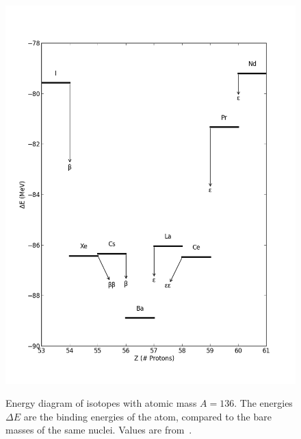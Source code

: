 \begin{figure}
\begin{center}
\includegraphics[keepaspectratio=true,width=\textwidth]{scripts/LevelDiagram.png}
\end{center}
\renewcommand{\baselinestretch}{1}
\small\normalsize
\begin{quote}
\caption{Energy diagram of isotopes with atomic mass $A=136$.  The energies $\Delta E$ are the binding energies of the atom, compared to the bare masses of the same nuclei.  Values are from~\cite{AtomicMassEvaluation}.}
\label{fig:LevelDiagram}
\end{quote}
\end{figure}
\renewcommand{\baselinestretch}{2}
\small\normalsize

